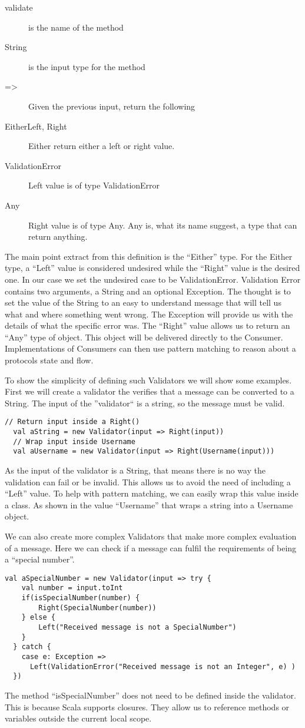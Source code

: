 \begin{description}
 \item[validate] is the name of the method
 \item[String] is the input type for the method
 \item[=>] Given the previous input, return the following
 \item[Either\lbrack Left, Right\rbrack] Either return either a left or right value.
 \item[ValidationError] Left value is of type ValidationError
 \item[Any] Right value is of type Any. Any is, what its name suggest, a type that can return anything.
\end{description}
The main point extract from this definition is the ``Either'' type. For the Either type, a ``Left'' value is considered undesired while the ``Right'' value is the desired one. In our case we set the undesired case to be ValidationError. Validation Error contains two arguments, a String and an optional Exception. The thought is to set the value of the String to an easy to understand message that will tell us what and where something went wrong. The Exception will provide us with the details of what the specific error was. The ``Right'' value allows us to return an ``Any'' type of object. This object will be delivered directly to the Consumer. Implementations of Consumers can then use pattern matching to reason about a protocols state and flow.

To show the simplicity of defining such Validators we will show some examples. First we will create a validator the verifies that a message can be converted to a String. The input of the ''validator`` is a string, so the message must be valid.
\begin{lstlisting}[style=myScalastyle]
  // Return input inside a Right()
  val aString = new Validator(input => Right(input))
  // Wrap input inside Username
  val aUsername = new Validator(input => Right(Username(input)))
\end{lstlisting}
As the input of the validator is a String, that means there is no way the validation can fail or be invalid. This allows us to avoid the need of including a ``Left'' value. To help with pattern matching, we can easily wrap this value inside a class. As shown in the value ``Username'' that wraps a string into a Username object.

We can also create more complex Validators that make more complex evaluation of a message. Here we can check if a message can fulfil the requirements of being a ``special number''.
\begin{lstlisting}[style=myScalastyle]
  val aSpecialNumber = new Validator(input => try {
    val number = input.toInt
    if(isSpecialNumber(number) {
        Right(SpecialNumber(number))
    } else {
        Left("Received message is not a SpecialNumber") 
    }
  } catch {
    case e: Exception =>
      Left(ValidationError("Received message is not an Integer", e) )
  })
\end{lstlisting}
The method ``isSpecialNumber'' does not need to be defined inside the validator. This is because Scala supports closures. They allow us to reference methods or variables outside the current local scope.

